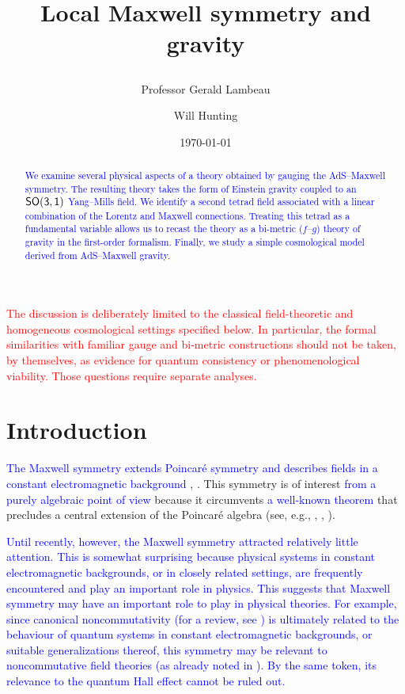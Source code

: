 \documentclass [prd,reprint,eqsecnum,nofootinbib]  {revtex4-1}
\newcommand{\corr}[1]{\textcolor{blue}{#1}}
\newcommand{\add}[1]{\textcolor{red}{#1}}
\begin{document}
\title{%

Local Maxwell symmetry and gravity}

\author{Professor Gerald Lambeau}
\author{Will Hunting}
\date{\today}

\begin{abstract}\noindent
\corr{We examine several physical aspects of a theory obtained by
gauging the AdS--Maxwell symmetry. The resulting theory takes the form
of Einstein gravity coupled to an $\sf{SO(3,1)}$ Yang--Mills field.
We identify a second tetrad field associated with a linear combination
of the Lorentz and Maxwell connections. Treating this tetrad as a
fundamental variable allows us to recast the theory as a bi-metric
($f$--$g$) theory of gravity in the first-order formalism. Finally,
we study a simple cosmological model derived from AdS--Maxwell gravity.}
\end{abstract}



\maketitle
\add{The discussion is deliberately limited to the classical field-theoretic
and homogeneous cosmological settings specified below. In particular, the
formal similarities with familiar gauge and bi-metric constructions should
not be taken, by themselves, as evidence for quantum consistency or
phenomenological viability. Those questions require separate analyses.}



\section{Introduction}

\corr{The Maxwell symmetry extends Poincar\'e symmetry and describes
fields in a constant electromagnetic background}
\cite{Bacry:1970ye}, \cite{Schrader:1972zd}. This symmetry is of
interest \corr{from a purely algebraic point of view} because it
circumvents \corr{a well-known theorem} that precludes a central
extension of the Poincar\'e algebra (see, e.g.,
\cite{Galindo:1967}, \cite{Soroka:2011tc}, \cite{Gomis:2009dm}).

\corr{Until recently, however, the Maxwell symmetry attracted
relatively little attention. This is somewhat surprising because
physical systems in constant electromagnetic backgrounds, or in
closely related settings, are frequently encountered and play an
important role in physics. This suggests that Maxwell symmetry may
have an important role to play in physical theories. For example,
since canonical noncommutativity (for a review, see
\cite{Douglas:2001ba}) is ultimately related to the behaviour of
quantum systems in constant electromagnetic backgrounds, or suitable
generalizations thereof, this symmetry may be relevant to
noncommutative field theories (as already noted in
\cite{Doplicher:1994tu}). By the same token, its relevance to the
quantum Hall effect cannot be ruled out.}
\end{document}
